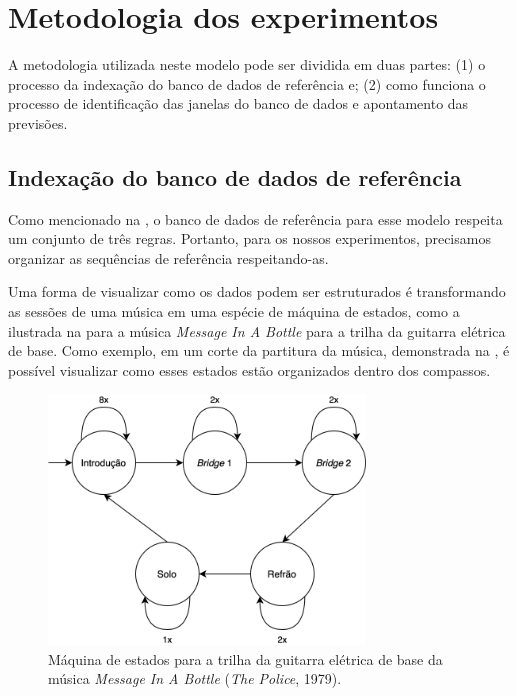\section{Metodologia dos experimentos}
\label{sec:dtw-metodology}

A metodologia utilizada neste modelo pode ser dividida em duas partes: (1) o processo da indexação do banco de dados de referência e; (2) como funciona o processo de identificação das janelas do banco de dados e apontamento das previsões.

\subsection{Indexação do banco de dados de referência}
\label{subsec:database_dtw}

Como mencionado na , o banco de dados de referência para esse modelo respeita um conjunto de três regras. Portanto, para os nossos experimentos, precisamos organizar as sequências de referência respeitando-as.

Uma forma de visualizar como os dados podem ser estruturados é transformando as sessões de uma música em uma espécie de máquina de estados, como a ilustrada na  para a música \textit{Message In A Bottle} para a trilha da guitarra elétrica de base. Como exemplo, em um corte da partitura da música, demonstrada na , é possível visualizar como esses estados estão organizados dentro dos compassos.

\begin{figure}[htbp]
    \centering
    \includegraphics[width=0.75\textwidth]{images/MIAB state machine.png}
    \caption{Máquina de estados para a trilha da guitarra elétrica de base da música \textit{Message In A Bottle} (\textit{The Police}, 1979).}
    \label{fig:miab_state_machine}
\end{figure}

